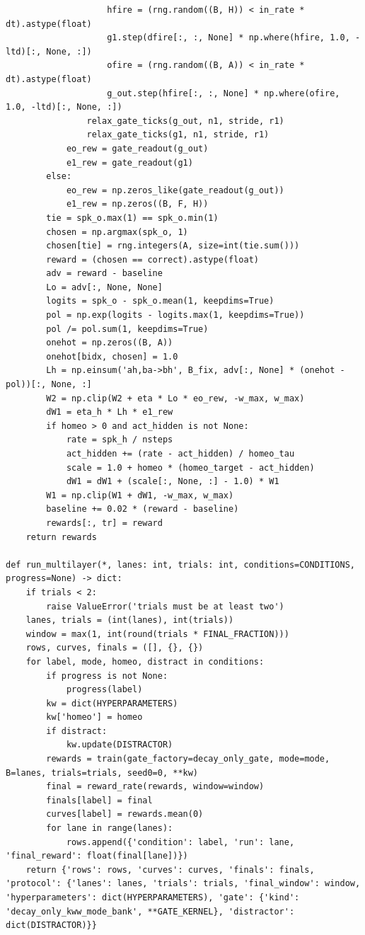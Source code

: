 \documentclass[a4paper,10pt]{article}
\begin{document}
\begin{Verbatim}
                    hfire = (rng.random((B, H)) < in_rate * dt).astype(float)
                    g1.step(dfire[:, :, None] * np.where(hfire, 1.0, -ltd)[:, None, :])
                    ofire = (rng.random((B, A)) < in_rate * dt).astype(float)
                    g_out.step(hfire[:, :, None] * np.where(ofire, 1.0, -ltd)[:, None, :])
                relax_gate_ticks(g_out, n1, stride, r1)
                relax_gate_ticks(g1, n1, stride, r1)
            eo_rew = gate_readout(g_out)
            e1_rew = gate_readout(g1)
        else:
            eo_rew = np.zeros_like(gate_readout(g_out))
            e1_rew = np.zeros((B, F, H))
        tie = spk_o.max(1) == spk_o.min(1)
        chosen = np.argmax(spk_o, 1)
        chosen[tie] = rng.integers(A, size=int(tie.sum()))
        reward = (chosen == correct).astype(float)
        adv = reward - baseline
        Lo = adv[:, None, None]
        logits = spk_o - spk_o.mean(1, keepdims=True)
        pol = np.exp(logits - logits.max(1, keepdims=True))
        pol /= pol.sum(1, keepdims=True)
        onehot = np.zeros((B, A))
        onehot[bidx, chosen] = 1.0
        Lh = np.einsum('ah,ba->bh', B_fix, adv[:, None] * (onehot - pol))[:, None, :]
        W2 = np.clip(W2 + eta * Lo * eo_rew, -w_max, w_max)
        dW1 = eta_h * Lh * e1_rew
        if homeo > 0 and act_hidden is not None:
            rate = spk_h / nsteps
            act_hidden += (rate - act_hidden) / homeo_tau
            scale = 1.0 + homeo * (homeo_target - act_hidden)
            dW1 = dW1 + (scale[:, None, :] - 1.0) * W1
        W1 = np.clip(W1 + dW1, -w_max, w_max)
        baseline += 0.02 * (reward - baseline)
        rewards[:, tr] = reward
    return rewards

def run_multilayer(*, lanes: int, trials: int, conditions=CONDITIONS, progress=None) -> dict:
    if trials < 2:
        raise ValueError('trials must be at least two')
    lanes, trials = (int(lanes), int(trials))
    window = max(1, int(round(trials * FINAL_FRACTION)))
    rows, curves, finals = ([], {}, {})
    for label, mode, homeo, distract in conditions:
        if progress is not None:
            progress(label)
        kw = dict(HYPERPARAMETERS)
        kw['homeo'] = homeo
        if distract:
            kw.update(DISTRACTOR)
        rewards = train(gate_factory=decay_only_gate, mode=mode, B=lanes, trials=trials, seed0=0, **kw)
        final = reward_rate(rewards, window=window)
        finals[label] = final
        curves[label] = rewards.mean(0)
        for lane in range(lanes):
            rows.append({'condition': label, 'run': lane, 'final_reward': float(final[lane])})
    return {'rows': rows, 'curves': curves, 'finals': finals, 'protocol': {'lanes': lanes, 'trials': trials, 'final_window': window, 'hyperparameters': dict(HYPERPARAMETERS), 'gate': {'kind': 'decay_only_kww_mode_bank', **GATE_KERNEL}, 'distractor': dict(DISTRACTOR)}}
\end{Verbatim}
\end{document}
